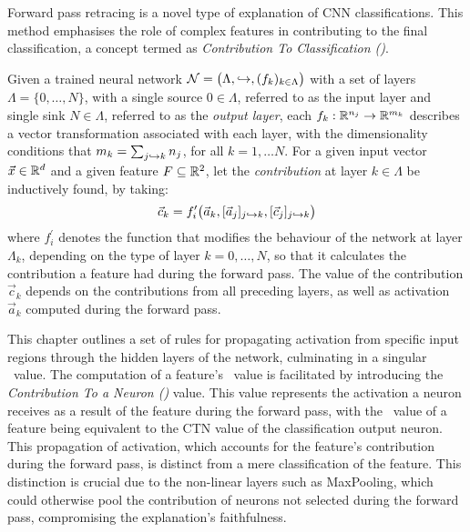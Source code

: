 Forward pass retracing is a novel type of explanation of CNN classifications. This method emphasises the role of complex features in contributing to the final classification, a concept termed as \emph{Contribution To Classification (\CTC)}.

\begin{definition}[Contribution]
Given a trained neural network $\mathcal{N}=\big(\Lambda,\hookrightarrow,(f_k)_{k\in \Lambda}\big)$ with a set of layers $\Lambda=\{0,\dots, N\}$, with a single source $0\in \Lambda$, referred to as the input layer and single sink $N\in \Lambda$, referred to as the \emph{output layer}, each $f_k:\mathbb{R}^{n_j}\to \mathbb{R}^{m_k}$ describes a vector transformation associated with each layer, with the dimensionality conditions that $m_k=\sum_{j\hookrightarrow k} n_j$, for all $k=1,\dots N$. For a given input vector $\vec{x}\in \mathbb{R}^d$ and a given feature $F\subseteq \mathbb{R}^2$, let the \emph{contribution} at layer $k\in \Lambda$ be inductively found, by taking:
\begin{equation*}
       \vec{c}_k = f_i^\prime\big(\vec{a}_k,[\vec{a}_j]_{j\hookrightarrow k},[\vec{c}_j]_{j\hookrightarrow k}\big)
\end{equation*}
where $f_i^\prime$ denotes the function that modifies the behaviour of the network at layer $\Lambda_k$, depending on the type of layer $k=0,\dots, N$, so that it calculates the contribution a feature had during the forward pass. The value of the contribution $\vec{c}_k$ depends on the contributions from all preceding layers, as well as activation $\vec{a}_k$ computed during the forward pass.
\end{definition}

This chapter outlines a set of rules for propagating activation from specific input regions through the hidden layers of the network, culminating in a singular \CTC\ value. The computation of a feature's \CTC\ value is facilitated by introducing the \emph{Contribution To a Neuron (\CTN)} value. This value represents the activation a neuron receives as a result of the feature during the forward pass, with the \CTC\ value of a feature being equivalent to the CTN value of the classification output neuron. This propagation of activation, which accounts for the feature's contribution during the forward pass, is distinct from a mere classification of the feature. This distinction is crucial due to the non-linear layers such as MaxPooling, which could otherwise pool the contribution of neurons not selected during the forward pass, compromising the explanation's faithfulness.


